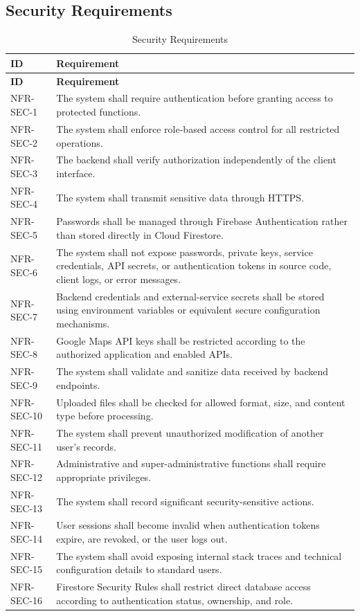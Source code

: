\subsection{Security Requirements}
\begin{longtable}{@{}p{2.6cm}p{10.8cm}@{}}
\caption{Security Requirements} \label{tab:nfr-sec} \\
\toprule \textbf{ID} & \textbf{Requirement} \\ \midrule
\endfirsthead
\toprule \textbf{ID} & \textbf{Requirement} \\ \midrule
\endhead
NFR-SEC-1 & The system shall require authentication before granting access to protected functions. \\
NFR-SEC-2 & The system shall enforce role-based access control for all restricted operations. \\
NFR-SEC-3 & The backend shall verify authorization independently of the client interface. \\
NFR-SEC-4 & The system shall transmit sensitive data through HTTPS. \\
NFR-SEC-5 & Passwords shall be managed through Firebase Authentication rather than stored directly in Cloud Firestore. \\
NFR-SEC-6 & The system shall not expose passwords, private keys, service credentials, API secrets, or authentication tokens in source code, client logs, or error messages. \\
NFR-SEC-7 & Backend credentials and external-service secrets shall be stored using environment variables or equivalent secure configuration mechanisms. \\
NFR-SEC-8 & Google Maps API keys shall be restricted according to the authorized application and enabled APIs. \\
NFR-SEC-9 & The system shall validate and sanitize data received by backend endpoints. \\
NFR-SEC-10 & Uploaded files shall be checked for allowed format, size, and content type before processing. \\
NFR-SEC-11 & The system shall prevent unauthorized modification of another user's records. \\
NFR-SEC-12 & Administrative and super-administrative functions shall require appropriate privileges. \\
NFR-SEC-13 & The system shall record significant security-sensitive actions. \\
NFR-SEC-14 & User sessions shall become invalid when authentication tokens expire, are revoked, or the user logs out. \\
NFR-SEC-15 & The system shall avoid exposing internal stack traces and technical configuration details to standard users. \\
NFR-SEC-16 & Firestore Security Rules shall restrict direct database access according to authentication status, ownership, and role. \\
\bottomrule
\end{longtable}

